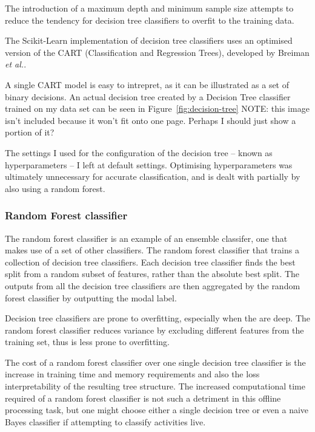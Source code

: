         The introduction of a maximum depth and minimum sample size attempts to reduce the tendency for decision tree classifiers to overfit to the training data.
      
        The Scikit-Learn implementation of decision tree classifiers uses an optimised version of the CART (Classification and Regression Trees), developed by Breiman \emph{et al.}\cite{breiman1984classification}.
        
        A single CART model is easy to intrepret, as it can be illustrated as a set of binary decisions. An actual decision tree created by a Decision Tree classifier trained on my data set can be seen in Figure~\ref{fig:decision-tree} NOTE: this image isn't included because it won't fit onto one page. Perhaps I should just show a portion of it?
        
        The settings I used for the configuration of the decision tree -- known as hyperparameters -- I left at default settings. Optimising hyperparameters was ultimately unnecessary for accurate classification, and is dealt with partially by also using a random forest.
        
      \subsubsection{Random Forest classifier}
        The random forest classifier is an example of an ensemble classifer, one that makes use of a set of other classifiers. The random forest classifier that trains a collection of decision tree classifiers. Each decision tree classifier finds the best split from a random subset of features, rather than the absolute best split. The outputs from all the decision tree classifiers are then aggregated by the random forest classifier by outputting the modal label.
        
        Decision tree classifiers are prone to overfitting, especially when the are deep. The random forest classifier reduces variance by excluding different features from the training set, thus is less prone to overfitting.
        
        The cost of a random forest classifier over one single decision tree classifier is the increase in training time and memory requirements and also the loss interpretability of the resulting tree structure. The increased computational time required of a random forest classifier is not such a detriment in this offline processing task, but one might choose either a single decision tree or even a naive Bayes classifier if attempting to classify activities live.
        
